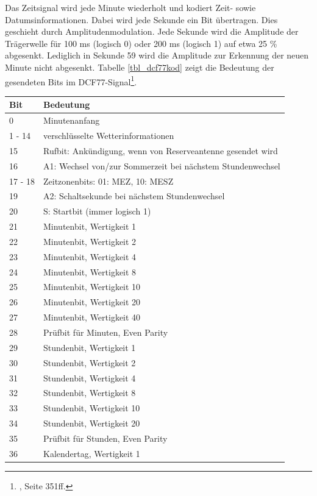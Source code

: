 Das Zeitsignal wird jede Minute wiederholt und kodiert Zeit- sowie Datumsinformationen. Dabei wird jede Sekunde ein Bit übertragen. Dies geschieht durch Amplitudenmodulation. Jede Sekunde wird die Amplitude der Trägerwelle für 100 ms (logisch 0) oder 200 ms (logisch 1) auf etwa 25 \% abgesenkt. Lediglich in Sekunde 59 wird die Amplitude zur Erkennung der neuen Minute nicht abgesenkt. Tabelle \ref{tbl_dcf77kod} zeigt die Bedeutung der gesendeten Bits im DCF77-Signal\footnote{\cite{dcf77}, Seite 351ff.}.
\newpage
%
\renewcommand{\arraystretch}{1}
\begin{longtable}{|l|l|}
\hline Bit & Bedeutung\\\hline\hline\endhead
\hline\endfoot\endlastfoot
%
0 & Minutenanfang\\\hline
1 - 14 & verschlüsselte Wetterinformationen\\\hline
15 & Rufbit: Ankündigung, wenn von Reserveantenne gesendet wird\\\hline
16 & A1: Wechsel von/zur Sommerzeit bei nächstem Stundenwechsel\\\hline
17 - 18 & Zeitzonenbits: 01: MEZ, 10: MESZ\\\hline
19 & A2: Schaltsekunde bei nächstem Stundenwechsel\\\hline
20 & S: Startbit (immer logisch 1)\\\hline
21 & Minutenbit, Wertigkeit 1\\\hline
22 & Minutenbit, Wertigkeit 2\\\hline
23 & Minutenbit, Wertigkeit 4\\\hline
24 & Minutenbit, Wertigkeit 8\\\hline
25 & Minutenbit, Wertigkeit 10\\\hline
26 & Minutenbit, Wertigkeit 20\\\hline
27 & Minutenbit, Wertigkeit 40\\\hline
28 & Prüfbit für Minuten, Even Parity\\\hline
29 & Stundenbit, Wertigkeit 1\\\hline
30 & Stundenbit, Wertigkeit 2\\\hline
31 & Stundenbit, Wertigkeit 4\\\hline
32 & Stundenbit, Wertigkeit 8\\\hline
33 & Stundenbit, Wertigkeit 10\\\hline
34 & Stundenbit, Wertigkeit 20\\\hline
35 & Prüfbit für Stunden, Even Parity\\\hline
36 & Kalendertag, Wertigkeit 1\\\hline

\end{longtable}
